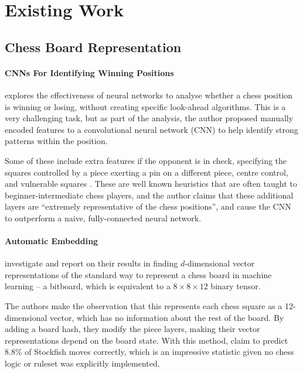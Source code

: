 \section{Existing Work}\label{relatedWorkSection}

\subsection{Chess Board Representation}

\paragraph{CNNs For Identifying Winning Positions}\citet{chessCNN} explores
the effectiveness of neural networks to analyse whether a chess position is
winning or losing, without creating specific look-ahead algorithms. This is a
very challenging task, but as part of the analysis, the author proposed
manually encoded features to a convolutional neural network (CNN) to help
identify strong patterns within the position. 

Some of these include extra features if the opponent is in check, specifying
the squares controlled by a piece exerting a pin on a different piece, centre
control, and vulnerable squares \citep{chessCNN}. These are well known
heuristics that are often taught to beginner-intermediate chess players, and
the author claims that these additional layers are ``extremely representative
of the chess positions'', and cause the CNN to outperform a naive,
fully-connected neural network.

\paragraph{Automatic Embedding}\citet{chess2vec} investigate and report on
their results in finding $d$-dimensional vector representations of the standard
way to represent a chess board in machine learning -- a bitboard, which is
equivalent to a $8\times8\times12$ binary tensor. 

The authors make the observation that this represents each chess square as a
12-dimensional vector, which has no information about the rest of the board. By
adding a board hash, they modify the piece layers, making their vector
representations depend on the board state. With this method, \citet{chess2vec}
claim to predict $8.8\%$ of Stockfish moves correctly, which is an impressive
statistic given no chess logic or ruleset was explicitly implemented.

